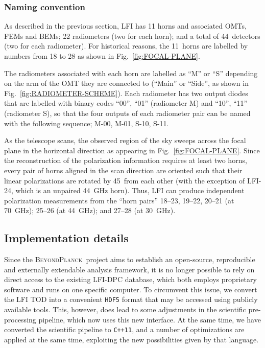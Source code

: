 \documentclass[twocolumn]{aa}
\newcommand{\BP}{\textsc{BeyondPlanck}}
\begin{document}
	



\subsubsection{Naming convention}

As described in the previous section, LFI has 11 horns and
associated OMTs, FEMs and BEMs; 22 radiometers (two for each horn);
and a total of 44~detectors (two for each radiometer). For historical
reasons, the 11~horns are labelled by numbers from 18 to 28 as shown
in Fig.~\ref{fig:FOCAL-PLANE}.

The radiometers associated with each horn are labelled as ``M'' or
``S'' depending on the arm of the OMT they are connected to (``Main''
or ``Side'', as shown in Fig.~\ref{fig:RADIOMETER-SCHEME}). Each
radiometer has two output diodes that are labelled with binary codes
``00'', ``01'' (radiometer M) and ``10'', ``11'' (radiometer S), so
that the four outputs of each radiometer pair can be named with the
following sequence; M-00, M-01, S-10, S-11.

As the telescope scans, the observed region of the sky sweeps across
the focal plane in the horizontal direction as appearing in
Fig.~\ref{fig:FOCAL-PLANE}. Since the reconstruction of the
polarization information requires at least two horns, every pair of
horns aligned in the scan direction are oriented such that their
linear polarizations are rotated by 45\deg\ from each other (with the
exception of LFI-24, which is an unpaired 44~GHz horn). Thus, LFI can
produce independent polarization measurements from the ``horn pairs''
18--23, 19--22, 20--21 (at 70~GHz); 25--26 (at 44~GHz); and 27--28 (at
30~GHz).
	
	
	
	
		

\subsection{Implementation details}

Since the \BP\ project aims to establish an open-source, reproducible
and externally extendable analysis framework, it is no longer possible
to rely on direct access to the existing LFI-DPC database, which both
employs proprietary software and runs on one specific computer. To
circumvent this issue, we convert the LFI TOD into a convenient
\texttt{HDF5} format \citep{bp03} that may be accessed using publicly
available tools. This, however, does lead to some adjustments in the
scientific pre-processing pipeline, which now uses this new interface.
At the same time, we have converted the scientific pipeline to
\texttt{C++11}, and a number of optimizations are applied at the same
time, exploiting the new possibilities given by that language.
\end{document}

